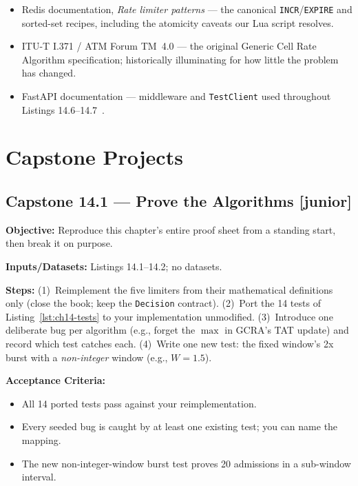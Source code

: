 \begin{itemize}
        \texttt{limit\_req} documentation where GCRA hides in plain sight
        (the \texttt{rate} and \texttt{burst} parameters map to $T$ and
        $\tau$).
  \item Redis documentation, \emph{Rate limiter patterns} --- the canonical
        \texttt{INCR}/\texttt{EXPIRE} and sorted-set recipes, including the
        atomicity caveats our Lua script resolves.
  \item ITU-T I.371 / ATM Forum TM~4.0 --- the original Generic Cell Rate
        Algorithm specification; historically illuminating for how little
        the problem has changed.
  \item FastAPI documentation --- middleware and \texttt{TestClient} used
        throughout Listings 14.6--14.7~\cite{fastapidocs}.
\end{itemize}

\section{Capstone Projects}
\label{sec:ch14-capstones}

\subsection*{Capstone 14.1 --- Prove the Algorithms \hfill [junior]}
\textbf{Objective:} Reproduce this chapter's entire proof sheet from a
standing start, then break it on purpose.

\textbf{Inputs/Datasets:} Listings 14.1--14.2; no datasets.

\textbf{Steps:} (1)~Reimplement the five limiters from their mathematical
definitions only (close the book; keep the \texttt{Decision} contract).
(2)~Port the 14 tests of Listing~\ref{lst:ch14-tests} to your
implementation unmodified. (3)~Introduce one deliberate bug per algorithm
(e.g., forget the $\max$ in GCRA's TAT update) and record which test
catches each. (4)~Write one new test: the fixed window's 2x burst with a
\emph{non-integer} window (e.g., $W = 1.5$).

\textbf{Acceptance Criteria:}
\begin{itemize}
  \item[$\square$] All 14 ported tests pass against your reimplementation.
  \item[$\square$] Every seeded bug is caught by at least one existing
        test; you can name the mapping.
  \item[$\square$] The new non-integer-window burst test proves 20
        admissions in a sub-window interval.
\end{itemize}

